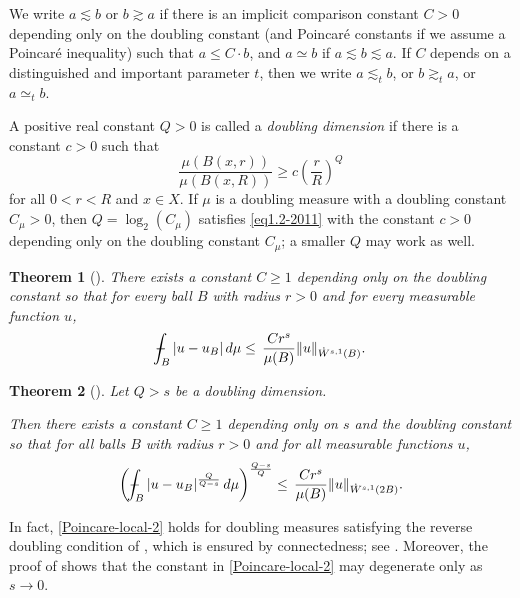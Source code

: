 \documentclass[11pt,leqno]{amsart}
\def\Xint#1{\mathchoice
	{\XXint\displaystyle\textstyle{#1}}
	{\XXint\textstyle\scriptstyle{#1}}
	{\XXint\scriptstyle\scriptscriptstyle{#1}}
	{\XXint\scriptscriptstyle\scriptscriptstyle{#1}}
	\!\int}
\def\XXint#1#2#3{{\setbox0=\hbox{$#1{#2#3}{\int}$ }
		\vcenter{\hbox{$#2#3$ }}\kern-.6\wd0}}
\def\dashint{\Xint-}
\newtheorem{theorem}{Theorem}[section]
\numberwithin{equation}{section}
\theoremstyle{definition}
\begin{document}
	
	We write $a \lesssim b$ or $b \gtrsim a$ 
	if there is an implicit comparison constant $C>0$ depending only on  the doubling constant
	(and  
	{Poincar\'e constants}	
	if we assume a Poincar\'e inequality) such that $a \leq C\cdot b$,  and $a \simeq b$ if
	$a \lesssim b \lesssim a$. If $C$ depends on a distinguished and important parameter $t$,
	then we write $a\lesssim_t b$, or $b\gtrsim_t a$, or $a\simeq_t b$.
	
	A positive real constant $Q>0$ is called a \emph{doubling dimension} if there is a constant $c>0$ such that
	\begin{equation}\label{eq1.2-2011}
		{ \frac{\mu(B(x,r))}{\mu(B(x,R))}\geq {c} \left( \frac{r}{R}\right)^Q }
	\end{equation}
	for all $0<r<R$ and $x\in X$. If $\mu$ is a doubling measure with a doubling constant $C_\mu>0$, then $Q=\log_2(C_\mu)$
	satisfies \eqref{eq1.2-2011}
	with the constant $c>0$ depending only on the doubling constant $C_\mu$;
	a smaller $Q$ may work as well. 
	
	
	\begin{theorem}[{\cite[Lemma 2.2]{DLV23}}]
		There exists a constant $C\ge 1$ depending only on the doubling constant so that for every ball
		$B$ with radius $r>0$ and for every measurable function $u$, 
		\begin{align}
			\dashint_{B}|u-u_{B}| \,d\mu
			\leq\,  \frac{C r^s}{\mu(B)} \|u\|_{\dot W^{s,1}(B)}.
			\label{Poincare-local-1}
		\end{align}
	\end{theorem}
	
	\begin{theorem}[{\cite[Theorem 3.4]{DLV23}}]
		
		
		Let $Q>s$ be a doubling dimension.
		
		Then there exists a constant $C\ge 1$ depending only on $s$ and the doubling constant so that for all balls $B$ with radius $r>0$ and for all measurable functions $u$, 
		\begin{align}
			\left(\dashint_{B}|u-u_{B}|^{\frac{Q}{Q-s}} \,d\mu\right)^{\frac{Q-s}{Q}} 
			\leq\, 
			\frac{C r^s}{\mu(B)} \|u\|_{\dot W^{s,1}(2 B)}.
			\label{Poincare-local-2}
		\end{align}
	\end{theorem}
	In fact, \eqref{Poincare-local-2} holds for doubling measures satisfying the reverse doubling condition of \cite[Theorem 3.4]{DLV23}, which is ensured by connectedness; see \cite[Corollary 3.8]{BB11}. Moreover, the proof of \cite[Theorem 3.4]{DLV23} shows that the constant in \eqref{Poincare-local-2} may degenerate only as $s \to 0$.
	
\end{document}
